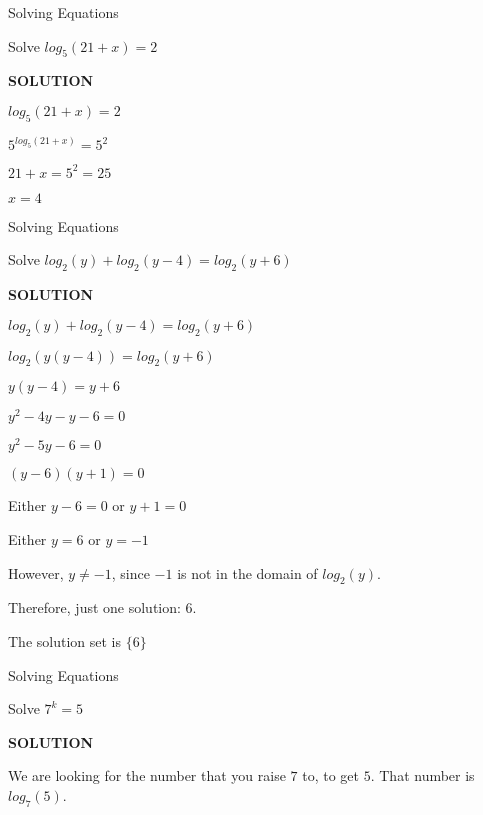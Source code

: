 \documentclass{ximera}
\begin{document}
\begin{example} Solving Equations


Solve $log_5(21 + x) = 2$


\textbf{\textcolor{purple!50!blue!90!black}{SOLUTION}}


$log_5(21 + x) = 2$

$5^{log_5(21 + x)} = 5^2$

$21 + x = 5^2 = 25$

$x = 4$

\end{example}










\begin{example} Solving Equations


Solve $log_2(y) + log_2(y-4) = log_2(y+6)$


\textbf{\textcolor{purple!50!blue!90!black}{SOLUTION}}


$log_2(y) + log_2(y-4) = log_2(y+6)$

$log_2(y(y-4)) = log_2(y+6)$

$y(y-4) = y+6$

$y^2 - 4y - y - 6 = 0$

$y^2 - 5y - 6 = 0$

$(y-6)(y+1) = 0$


Either $y-6 = 0$ or $y+1 = 0$

Either $y = 6$ or $y = -1$

However, $y \ne -1$, since $-1$ is not in the domain of $log_2(y)$.

Therefore, just one solution: $6$.

The solution set is $\{ 6 \}$

\end{example}






\begin{example} Solving Equations


Solve $7^k = 5$


\textbf{\textcolor{purple!50!blue!90!black}{SOLUTION}}


We are looking for the number that you raise $7$ to, to get $5$.  That number  is $log_7(5)$.

\end{example}
\end{document}
